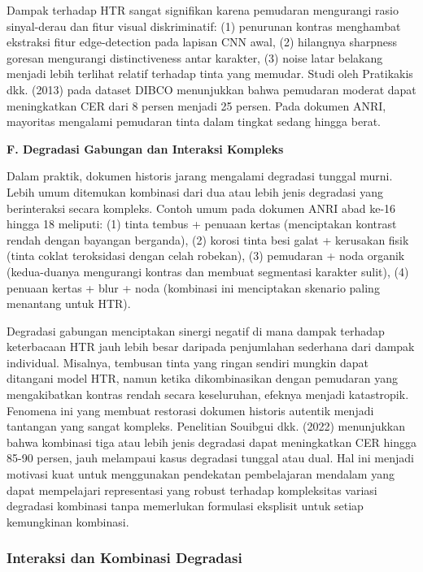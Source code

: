 \documentclass[12pt,a4paper]{article}
\begin{document}
Dampak terhadap HTR sangat signifikan karena pemudaran mengurangi rasio sinyal-derau dan fitur visual diskriminatif: (1) penurunan kontras menghambat ekstraksi fitur edge-detection pada lapisan CNN awal, (2) hilangnya sharpness goresan mengurangi distinctiveness antar karakter, (3) noise latar belakang menjadi lebih terlihat relatif terhadap tinta yang memudar. Studi oleh Pratikakis dkk. (2013) pada dataset DIBCO menunjukkan bahwa pemudaran moderat dapat meningkatkan CER dari 8 persen menjadi 25 persen. Pada dokumen ANRI, mayoritas mengalami pemudaran tinta dalam tingkat sedang hingga berat.

\vspace{0.5ex}
\noindent\textbf{F. Degradasi Gabungan dan Interaksi Kompleks}

Dalam praktik, dokumen historis jarang mengalami degradasi tunggal murni. Lebih umum ditemukan kombinasi dari dua atau lebih jenis degradasi yang berinteraksi secara kompleks. Contoh umum pada dokumen ANRI abad ke-16 hingga 18 meliputi: (1) tinta tembus + penuaan kertas (menciptakan kontrast rendah dengan bayangan berganda), (2) korosi tinta besi galat + kerusakan fisik (tinta coklat teroksidasi dengan celah robekan), (3) pemudaran + noda organik (kedua-duanya mengurangi kontras dan membuat segmentasi karakter sulit), (4) penuaan kertas + blur + noda (kombinasi ini menciptakan skenario paling menantang untuk HTR).

Degradasi gabungan menciptakan sinergi negatif di mana dampak terhadap keterbacaan HTR jauh lebih besar daripada penjumlahan sederhana dari dampak individual. Misalnya, tembusan tinta yang ringan sendiri mungkin dapat ditangani model HTR, namun ketika dikombinasikan dengan pemudaran yang mengakibatkan kontras rendah secara keseluruhan, efeknya menjadi katastropik. Fenomena ini yang membuat restorasi dokumen historis autentik menjadi tantangan yang sangat kompleks. Penelitian Souibgui dkk. (2022) menunjukkan bahwa kombinasi tiga atau lebih jenis degradasi dapat meningkatkan CER hingga 85-90 persen, jauh melampaui kasus degradasi tunggal atau dual. Hal ini menjadi motivasi kuat untuk menggunakan pendekatan pembelajaran mendalam yang dapat mempelajari representasi yang robust terhadap kompleksitas variasi degradasi kombinasi tanpa memerlukan formulasi eksplisit untuk setiap kemungkinan kombinasi.

\subsubsection{Interaksi dan Kombinasi Degradasi}
\label{subsubsec:interaksi-degradasi}
\end{document}
